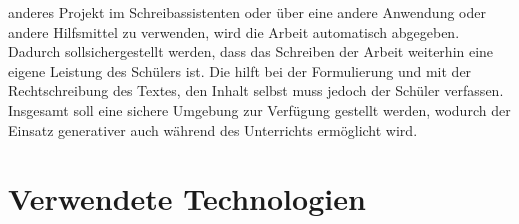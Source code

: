 \documentclass[../main.tex]{subfiles}
\begin{document}
anderes Projekt im Schreibassistenten oder über eine andere Anwendung  oder andere Hilfsmittel zu verwenden, wird die Arbeit automatisch abgegeben. Dadurch sollsichergestellt 
werden, dass das Schreiben der Arbeit weiterhin eine eigene Leistung des Schülers ist. Die  hilft bei der Formulierung und mit der Rechtschreibung des Textes, den Inhalt selbst 
muss jedoch der Schüler verfassen. Insgesamt soll eine sichere Umgebung zur Verfügung gestellt werden, wodurch der Einsatz generativer  auch während des Unterrichts ermöglicht wird.


\section{Verwendete Technologien}
\end{document}
